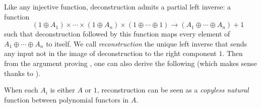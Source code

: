 Like any injective function, deconstruction admits a partial left inverse: a function
    \[ \qquad (1 \oplus A_1) \times \cdots \times (1 \oplus A_n) \times (1 \oplus \cdots
  \oplus 1) \longrightarrow (A_1 \oplus \cdots \oplus A_n) + 1 \]
such that deconstruction followed by this function maps every element of $A_1 \oplus \cdots \oplus A_n$ to itself.
We call \emph{reconstruction} the unique left inverse that sends any input not in the image of deconstruction to the right component $1$. Then from the argument proving , one can also derive the following (which makes sense thanks to ).
\begin{lemma}\label{lem:reconstruction}
  When each $A_i$ is either $A$ or $1$, reconstruction can be seen as a \emph{copyless natural} function between polynomial functors in $A$.
\end{lemma}

